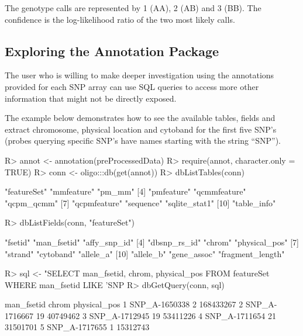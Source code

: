 \documentclass{article}
\begin{document}
The genotype calls are represented by 1 (AA), 2 (AB) and 3 (BB). The
confidence is the log-likelihood ratio of the two most likely calls.

\subsection{Exploring the Annotation Package}

The user who is willing to make deeper investigation using the
annotations provided for each SNP array can use SQL queries to access
more other information that might not be directly exposed.

The example below demonstrates how to see the available tables, fields
and extract chromosome, physical location and cytoband for the first
five SNP's (probes querying specific SNP's have names starting with
the string ``SNP'').

\begin{Schunk}
\begin{Sinput}
R> annot <- annotation(preProcessedData)
R> require(annot, character.only = TRUE)
R> conn <- oligo:::db(get(annot))
R> dbListTables(conn)
\end{Sinput}
\begin{Soutput}
 [1] "featureSet"   "mmfeature"    "pm_mm"       
 [4] "pmfeature"    "qcmmfeature"  "qcpm_qcmm"   
 [7] "qcpmfeature"  "sequence"     "sqlite_stat1"
[10] "table_info"  
\end{Soutput}
\begin{Sinput}
R> dbListFields(conn, "featureSet")
\end{Sinput}
\begin{Soutput}
 [1] "fsetid"          "man_fsetid"      "affy_snp_id"    
 [4] "dbsnp_rs_id"     "chrom"           "physical_pos"   
 [7] "strand"          "cytoband"        "allele_a"       
[10] "allele_b"        "gene_assoc"      "fragment_length"
\end{Soutput}
\begin{Sinput}
R> sql <- "SELECT man_fsetid, chrom, physical_pos FROM featureSet WHERE man_fsetid LIKE 'SNP%
R> dbGetQuery(conn, sql)
\end{Sinput}
\begin{Soutput}
     man_fsetid chrom physical_pos
1 SNP_A-1650338     2    168433267
2 SNP_A-1716667    19     40749462
3 SNP_A-1712945    19     53411226
4 SNP_A-1711654    21     31501701
5 SNP_A-1717655     1     15312743
\end{Soutput}
\end{Schunk}
 
\end{document}
